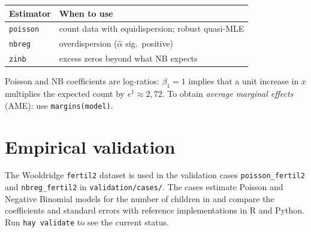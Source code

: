 \begin{center}
\begin{tabular}{ll}
\toprule
\textbf{Estimator} & \textbf{When to use} \\
\midrule
\texttt{poisson}  & count data with equidispersion; robust quasi-MLE \\
\texttt{nbreg}    & overdispersion ($\hat\alpha$ sig.\ positive) \\
\texttt{zinb}     & excess zeros beyond what NB expects \\
\bottomrule
\end{tabular}
\end{center}

\begin{nota}
  Poisson and NB coefficients are log-ratios: $\beta_1 = 1$ implies that a
  unit increase in $x$ multiplies the expected count by $e^1 \approx 2{,}72$.
  To obtain \emph{average marginal effects} (AME): use
  \lstinline{margins(model)}.
\end{nota}

\section{Empirical validation}

The Wooldridge \texttt{fertil2} dataset is used in the validation cases
\texttt{poisson_fertil2} and \texttt{nbreg_fertil2} in \texttt{validation/cases/}.
The cases estimate Poisson and Negative Binomial models for the number of
children in \hayashi{} and compare the coefficients and standard errors with
reference implementations in R and Python. Run \lstinline{hay validate} to see the
current status.
